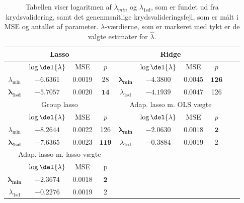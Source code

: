 \begin{table}[ht]
\center
\begin{tabular}{cccc | cccccc}
\toprule
   \multicolumn{4}{c}{Lasso} &  \multicolumn{4}{c}{Ridge}  \\ \midrule
 & \(\log \del{\lambda}\) & MSE & $p$ & & \(\log \del{\lambda}\) & MSE & $p$ \\
 $\lambda_{\min}$ &$-6.6361$& 0.0019 & 28 &	$\boldsymbol{\lambda_{\min}}$ &  $\mathbf{-4.3800}$ &   $\mathbf{0.0045} $&  $\mathbf{126}$ \\ 
 $\boldsymbol{\lambda}_{\textbf{1sd}}$ & $\mathbf{-5.7057}$ & $\mathbf{0.0020} $& $\mathbf{14}$ & $\lambda_{ \text{1sd}}$& $-4.1939$ & 0.0047 & 126  \\ \bottomrule \toprule
\multicolumn{4}{c}{Group lasso}  &  \multicolumn{4}{c}{Adap. lasso m. OLS vægte}  \\ \midrule
& \(\log \del{\lambda}\) & MSE &$ p $ && \(\log \del{\lambda}\) & MSE & $p$ &  \\
$\lambda_{\min}$& $-8.2644$ & 0.0022  & 126 & $\boldsymbol{\lambda_{\min}}$  & $\mathbf{-2.0630}$ &$ \mathbf{0.0018}$ & $\mathbf{2}$ \\
  $\boldsymbol{\lambda}_{\textbf{1sd}}$  & $\mathbf{-7.6365}$ &$ \mathbf{0.0023}$ & $\mathbf{119}$ &  $\lambda_{1\text{sd}}$ & $-0.3884$ & 0.0019 & 2 \\  \bottomrule 
  \toprule
  \multicolumn{4}{c}{Adap. lasso m. lasso vægte}  \\ \cmidrule{1-4}
& \(\log \del{\lambda}\) & MSE & p \\
$\boldsymbol{\lambda_{\min}}$   &  $ \mathbf{-2.3674}$ & $ \mathbf{0.0018} $& $ \mathbf{2}$   \\
$\lambda_{1\text{sd}}$  & $-0.2276$ & 0.0019 & 2  \\ \cmidrule{1-4}
 \end{tabular}
\caption{Tabellen viser logaritmen af $\lambda_{min}$ og $\lambda_{1\text{sd}}$, som er  fundet ud fra krydsvalidering, samt det genenmsnitlige krydsvalideringsfejl, som er målt i MSE og antallet af parameter. $\lambda$-værdierne, som er markeret med tykt er de valgte estimater for $\widehat{\lambda}$.} \label{tab:cv_tab}
\end{table}
